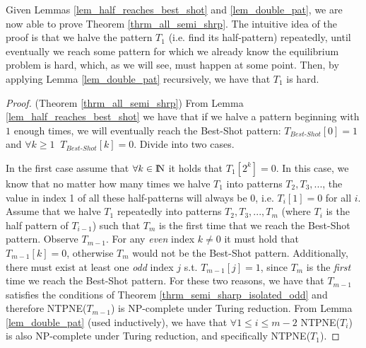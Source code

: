 \documentclass[runningheads]{llncs}
\begin{document}
Given Lemmas \ref{lem_half_reaches_best_shot} and \ref{lem_double_pat}, we are now able to prove Theorem \ref{thrm_all_semi_shrp}. The intuitive idea of the proof is that we halve the pattern $T_1$ (i.e. find its half-pattern) repeatedly, until eventually we reach some pattern for which we already know the equilibrium problem is hard, which, as we will see, must happen at some point. Then, by applying Lemma \ref{lem_double_pat} recursively, we have that $T_1$ is hard.

\begin{proof}(Theorem \ref{thrm_all_semi_shrp})
From Lemma \ref{lem_half_reaches_best_shot} we have that if we halve a pattern beginning with $1$ enough times, we will eventually reach the Best-Shot pattern: $T_{Best\mbox{-}Shot}[0]=1$ and $\forall k\geq 1 \;\; T_{Best\mbox{-}Shot}[k]=0$. Divide into two cases.

In the first case assume that $\forall k\in {\rm I\!N}$ it holds that $T_1[2^k]=0$. In this case, we know that no matter how many times we halve $T_1$ into patterns $T_2,T_3,...$, the value in index 1 of all these half-patterns will always be 0, i.e. $T_i[1]=0$ for all $i$. Assume that we halve $T_1$ repeatedly into patterns $T_2,T_3,...,T_m$ (where $T_{i}$ is the half pattern of $T_{i-1}$) such that $T_m$ is the first time that we reach the Best-Shot pattern. Observe $T_{m-1}$. For any \textit{even} index $k\ne 0$ it must hold that $T_{m-1}[k]=0$, otherwise $T_m$ would not be the Best-Shot pattern. Additionally, there must exist at least one \textit{odd} index $j$ s.t. $T_{m-1}[j]=1$, since $T_m$ is the \textit{first} time we reach the Best-Shot pattern. For these two reasons, we have that $T_{m-1}$ satisfies the conditions of Theorem \ref{thrm_semi_sharp_isolated_odd} and therefore NTPNE($T_{m-1}$) is NP-complete under Turing reduction. From Lemma \ref{lem_double_pat} (used inductively), we have that $\forall 1\leq i\leq m-2$ NTPNE($T_i$) is also NP-complete under Turing reduction, and specifically NTPNE($T_1$).


\end{proof}
\end{document}
